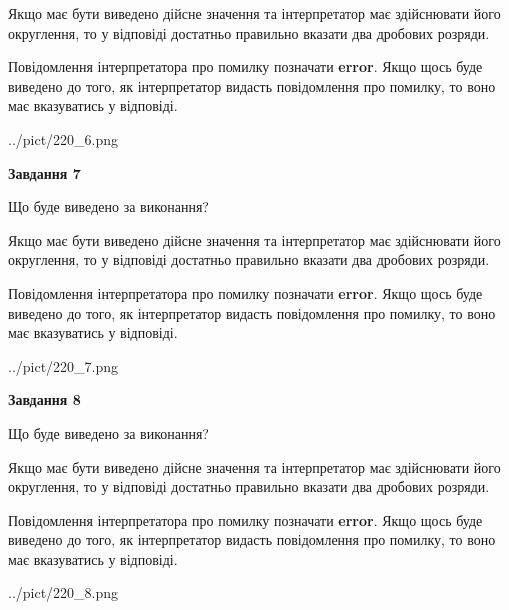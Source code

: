 \documentclass[12pt, ukrainian]{article}
\begin{document}
{\begin {Large}
Якщо має бути виведено дійсне значення та інтерпретатор має здійснювати його округлення, 
то у відповіді достатньо правильно вказати два дробових розряди.

Повідомлення інтерпретатора про помилку позначати \textbf{error}.
Якщо щось буде виведено до того, як інтерпретатор видасть повідомлення про помилку, 
то воно має вказуватись у відповіді. \par

\begin{center}
	{../pict/220_6.png}
\end{center}
\newpage

{\begin {center}\textbf{Завдання 7}\end {center}}\par
Що буде виведено за виконання? \par

Якщо має бути виведено дійсне значення та інтерпретатор має здійснювати його округлення, 
то у відповіді достатньо правильно вказати два дробових розряди.

Повідомлення інтерпретатора про помилку позначати \textbf{error}.
Якщо щось буде виведено до того, як інтерпретатор видасть повідомлення про помилку, 
то воно має вказуватись у відповіді. \par

\begin{center}
	{../pict/220_7.png}
\end{center}
\newpage

{\begin {center}\textbf{Завдання 8}\end {center}}\par
Що буде виведено за виконання? \par

Якщо має бути виведено дійсне значення та інтерпретатор має здійснювати його округлення, 
то у відповіді достатньо правильно вказати два дробових розряди.

Повідомлення інтерпретатора про помилку позначати \textbf{error}.
Якщо щось буде виведено до того, як інтерпретатор видасть повідомлення про помилку, 
то воно має вказуватись у відповіді. \par

\begin{center}
	{../pict/220_8.png}
\end{center}
\newpage


\end{Large}}
\end{document}
